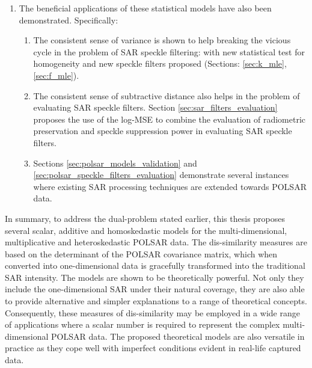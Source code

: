 \begin{enumerate}
\begin{enumerate}
                \end{enumerate}
\item The beneficial applications of these
                statistical models have also been demonstrated. Specifically:
                \begin{enumerate}
                \item \label{itm:filter_vicious_circle} The consistent sense of variance
                is shown to help breaking the vicious cycle in the problem of SAR
                speckle filtering: with new statistical test for
                homogeneity and new speckle filters proposed (Sections: \ref{sec:k_mle}, \ref{sec:f_mle}).
                \item \label{itm:log_mse} The consistent sense of subtractive
                distance also helps in the problem of evaluating SAR
                speckle filters. Section \ref{sec:sar_filters_evaluation} proposes the use of the log-MSE to combine the
                evaluation of radiometric preservation and speckle
                suppression power in evaluating SAR speckle filters.
                \item \label{itm:extend_sar_to_polsar} Sections \ref{sec:polsar_models_validation} and \ref{sec:polsar_speckle_filters_evaluation} demonstrate several instances where existing SAR
                processing techniques are extended towards POLSAR data.
                \end{enumerate}
\end{enumerate}

In summary, to address the dual-problem stated earlier, this thesis proposes several
scalar, additive and homoskedastic models for the multi-dimensional, multiplicative
and heteroskedastic POLSAR data. 
The dis-similarity measures are based on the determinant of the POLSAR covariance matrix,
  which when converted into one-dimensional data
  is gracefully transformed into the traditional SAR intensity.
The models are shown to be theoretically powerful.
Not only they include the one-dimensional SAR under their natural coverage, 
they are also able to provide alternative and simpler explanations to a range of theoretical concepts. 
Consequently, these measures of dis-similarity may be employed in a wide range of applications
  where a scalar number is required to represent the complex multi-dimensional POLSAR data.
The proposed theoretical models are also versatile in practice
  as they cope well with imperfect conditions evident in real-life captured data.


